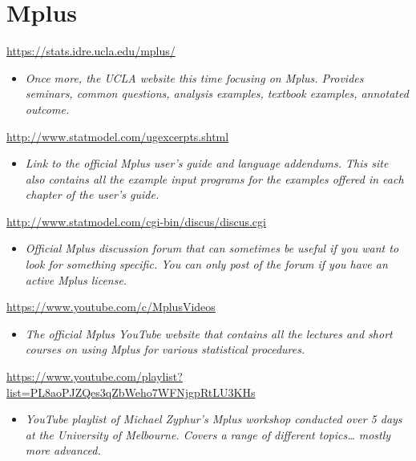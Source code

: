 \documentclass[
]{book}
\providecommand{\tightlist}{%
  \setlength{\itemsep}{0pt}\setlength{\parskip}{0pt}}
\begin{document}
\hypertarget{mplus}{%
\section{Mplus}\label{mplus}}

\url{https://stats.idre.ucla.edu/mplus/}

\begin{itemize}
\tightlist
\item
  \emph{Once more, the UCLA website this time focusing on Mplus. Provides seminars, common questions, analysis examples, textbook examples, annotated outcome.}
\end{itemize}

\url{http://www.statmodel.com/ugexcerpts.shtml}

\begin{itemize}
\tightlist
\item
  \emph{Link to the official Mplus user's guide and language addendums. This site also contains all the example input programs for the examples offered in each chapter of the user's guide.}
\end{itemize}

\url{http://www.statmodel.com/cgi-bin/discus/discus.cgi}

\begin{itemize}
\tightlist
\item
  \emph{Official Mplus discussion forum that can sometimes be useful if you want to look for something specific. You can only post of the forum if you have an active Mplus license.}
\end{itemize}

\url{https://www.youtube.com/c/MplusVideos}

\begin{itemize}
\tightlist
\item
  \emph{The official Mplus YouTube website that contains all the lectures and short courses on using Mplus for various statistical procedures.}
\end{itemize}

\url{https://www.youtube.com/playlist?list=PL8aoPJZQes3qZbWeho7WFNjgpRtLU3KHs}

\begin{itemize}
\tightlist
\item
  \emph{YouTube playlist of Michael Zyphur's Mplus workshop conducted over 5 days at the University of Melbourne. Covers a range of different topics\ldots{} mostly more advanced.}
\end{itemize}
\end{document}
